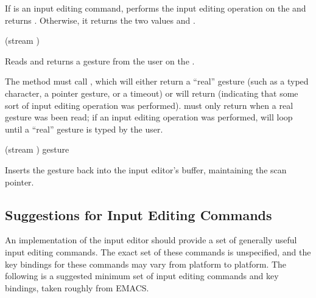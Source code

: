 If  is an input editing command, 
performs the input editing operation on the 
 and returns .  Otherwise, it returns the two values
 and .

 {(stream ) \key}

Reads and returns a gesture from the user on the 
.

The  method must call , which
will either return a ``real'' gesture (such as a typed character, a pointer
gesture, or a timeout) or will return  (indicating that some sort of
input editing operation was performed).   must only
return when a real gesture was been read; if an input editing operation was
performed,  will loop until a ``real'' gesture is
typed by the user.

 {(stream ) gesture}

Inserts the gesture  back into the input editor's buffer,
maintaining the scan pointer.


\subsection {Suggestions for Input Editing Commands}

An implementation of the input editor should provide a set of generally useful
input editing commands.  The exact set of these commands is unspecified, and the
key bindings for these commands may vary from platform to platform.  The
following is a suggested minimum set of input editing commands and key bindings,
taken roughly from EMACS.

